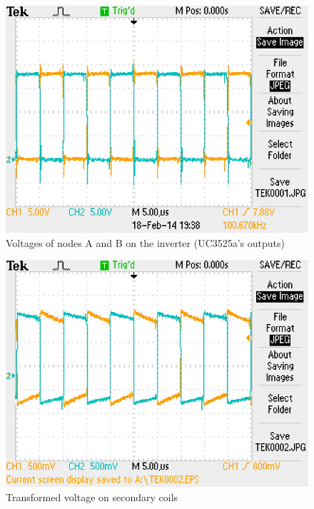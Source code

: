 \documentclass[final]{scrreprt} %
\begin{document}
\begin{figure}[h]
	\begin{center}
		\includegraphics[width=\linewidth/2]{resources/AandB-rc.jpg}
	\end{center}
	\caption{Voltages of nodes A and B on the inverter (UC3525a's outputs)}
	\label{fig:AandB}
\end{figure}

\begin{figure}[h]
	\begin{center}
		\includegraphics[width=\linewidth/2]{resources/AC_sec-rc.jpg}
	\end{center}
	\caption{Transformed voltage on secondary coils}
	\label{fig:AC_sec}
\end{figure}
\end{document}
